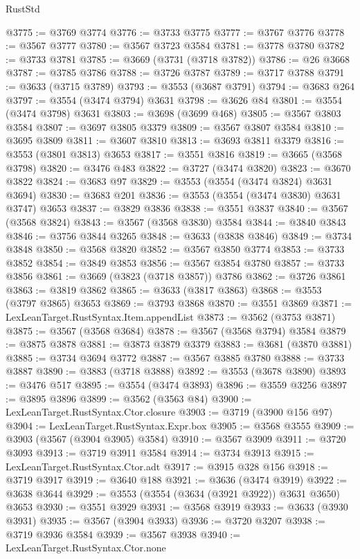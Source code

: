\begin{lexlean}{RustStd}
\begin{coremodule}
@3775 := @3769 @3774
@3776 := @3733 @3775
@3777 := @3767 @3776
@3778 := @3567 @3777
@3780 := @3567 @3723 @3584
@3781 := @3778 @3780
@3782 := @3733 @3781
@3785 := @3669 (@3731 (@3718 @3782))
@3786 := @26 @3668
@3787 := @3785 @3786
@3788 := @3726 @3787
@3789 := @3717 @3788
@3791 := @3633 (@3715 @3789)
@3793 := @3553 (@3687 @3791)
@3794 := @3683 @264
@3797 := @3554 (@3474 @3794) @3631
@3798 := @3626 @84
@3801 := @3554 (@3474 @3798) @3631
@3803 := @3698 (@3699 @468)
@3805 := @3567 @3803 @3584
@3807 := @3697 @3805 @3379
@3809 := @3567 @3807 @3584
@3810 := @3695 @3809
@3811 := @3607 @3810
@3813 := @3693 @3811 @3379
@3816 := @3553 (@3801 @3813) @3653
@3817 := @3551 @3816
@3819 := @3665 (@3568 @3798)
@3820 := @3476 @483
@3822 := @3727 (@3474 @3820)
@3823 := @3670 @3822
@3824 := @3683 @97
@3829 := @3553 (@3554 (@3474 @3824) @3631 @3694)
@3830 := @3683 @201
@3836 := @3553 (@3554 (@3474 @3830) @3631 @3747) @3653
@3837 := @3829 @3836
@3838 := @3551 @3837
@3840 := @3567 (@3568 @3824)
@3843 := @3567 (@3568 @3830) @3584
@3844 := @3840 @3843
@3846 := @3756 @3844 @3265
@3848 := @3633 (@3838 @3846)
@3849 := @3734 @3848
@3850 := @3568 @3820
@3852 := @3567 @3850 @3774
@3853 := @3733 @3852
@3854 := @3849 @3853
@3856 := @3567 @3854 @3780
@3857 := @3733 @3856
@3861 := @3669 (@3823 (@3718 @3857)) @3786
@3862 := @3726 @3861
@3863 := @3819 @3862
@3865 := @3633 (@3817 @3863)
@3868 := @3553 (@3797 @3865) @3653
@3869 := @3793 @3868
@3870 := @3551 @3869
@3871 := LexLeanTarget.RustSyntax.Item.appendList
@3873 := @3562 (@3753 @3871)
@3875 := @3567 (@3568 @3684)
@3878 := @3567 (@3568 @3794) @3584
@3879 := @3875 @3878
@3881 := @3873 @3879 @3379
@3883 := @3681 (@3870 @3881)
@3885 := @3734 @3694 @3772
@3887 := @3567 @3885 @3780
@3888 := @3733 @3887
@3890 := @3883 (@3718 @3888)
@3892 := @3553 (@3678 @3890)
@3893 := @3476 @517
@3895 := @3554 (@3474 @3893)
@3896 := @3559 @3256
@3897 := @3895 @3896
@3899 := @3562 (@3563 @84)
@3900 := LexLeanTarget.RustSyntax.Ctor.closure
@3903 := @3719 (@3900 @156 @97)
@3904 := LexLeanTarget.RustSyntax.Expr.box
@3905 := @3568 @3555
@3909 := @3903 (@3567 (@3904 @3905) @3584)
@3910 := @3567 @3909
@3911 := @3720 @3093
@3913 := @3719 @3911 @3584
@3914 := @3734 @3913
@3915 := LexLeanTarget.RustSyntax.Ctor.adt
@3917 := @3915 @328 @156
@3918 := @3719 @3917
@3919 := @3640 @188
@3921 := @3636 (@3474 @3919)
@3922 := @3638 @3644
@3929 := @3553 (@3554 (@3634 (@3921 @3922)) @3631 @3650) @3653
@3930 := @3551 @3929
@3931 := @3568 @3919
@3933 := @3633 (@3930 @3931)
@3935 := @3567 (@3904 @3933)
@3936 := @3720 @3207
@3938 := @3719 @3936 @3584
@3939 := @3567 @3938
@3940 := LexLeanTarget.RustSyntax.Ctor.none

\end{coremodule}
\end{lexlean}
